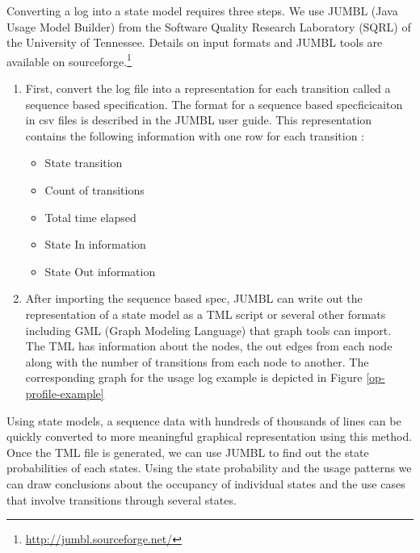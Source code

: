 Converting a log into a state model requires three steps.  We use JUMBL (Java Usage Model Builder) from the Software Quality Research Laboratory (SQRL) of the University of Tennessee.    Details on input formats and JUMBL tools are available on sourceforge.\footnote{\url{http://jumbl.sourceforge.net/}}
\begin{enumerate}
\item
First, convert the log file into a representation for each transition called a sequence based specification. The format for a sequence based specficicaiton in csv files is described in the JUMBL user guide. This representation contains the following information with one row for each transition :
\begin{itemize}
\item State transition
\item Count of transitions
\item Total time elapsed
\item State In information
\item State Out information
\end{itemize}

\item
After importing the sequence based spec, JUMBL can write out the representation of a state model as a TML script or several other formats including GML (Graph Modeling Language) that graph tools can import.  The TML  has information about the nodes, the out edges from each node along with the number of transitions from each node to another. The corresponding graph for the usage log example is depicted in Figure \ref{op-profile-example}
\end{enumerate}


Using state models, a sequence data with hundreds of thousands of lines can be quickly converted to more meaningful graphical representation using this method. Once the TML file is generated, we can use JUMBL to find out the state probabilities of each states. Using the state probability and the usage patterns we can draw conclusions about the occupancy of individual states and the use cases that involve transitions through several states.



%
%
%
%
%
%
%
%
%



